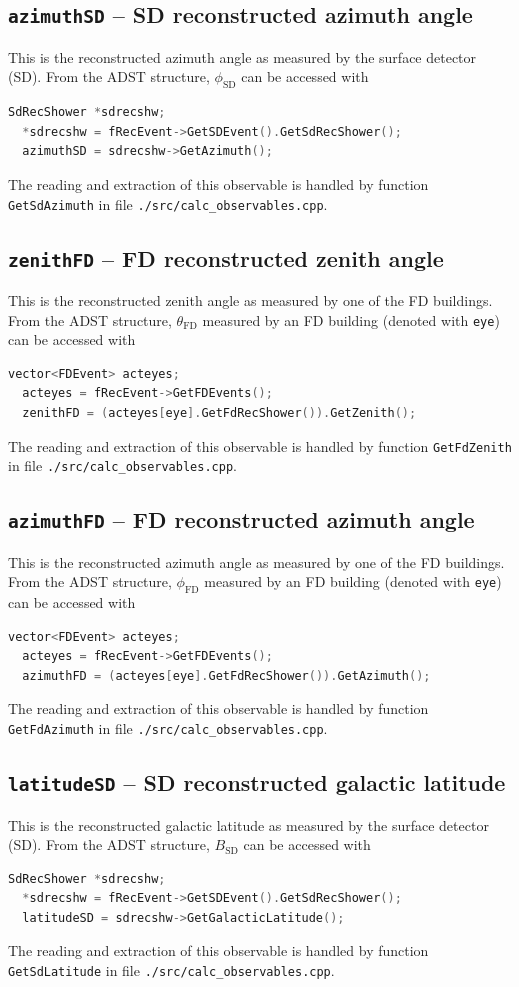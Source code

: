 \documentclass[12pt,a4paper]{report}
\begin{document}
\subsection{\texttt{azimuthSD} -- SD reconstructed azimuth angle}
This is the reconstructed azimuth angle as measured by the surface detector (SD). From the ADST structure, $\phi_{\textrm{SD}}$ can be accessed with
\begin{lstlisting}[language=C++]
  SdRecShower *sdrecshw;
  *sdrecshw = fRecEvent->GetSDEvent().GetSdRecShower();
  azimuthSD = sdrecshw->GetAzimuth();
\end{lstlisting}
The reading and extraction of this observable is handled by function \texttt{GetSdAzimuth} in file \texttt{./src/calc\_observables.cpp}.

\subsection{\texttt{zenithFD} -- FD reconstructed zenith angle}
This is the reconstructed zenith angle as measured by one of the FD buildings. From the ADST structure, $\theta_{\textrm{FD}}$ measured by an FD building (denoted with \texttt{eye}) can be accessed with
\begin{lstlisting}[language=C++]
  vector<FDEvent> acteyes;
  acteyes = fRecEvent->GetFDEvents();
  zenithFD = (acteyes[eye].GetFdRecShower()).GetZenith();
\end{lstlisting}
The reading and extraction of this observable is handled by function \texttt{GetFdZenith} in file \texttt{./src/calc\_observables.cpp}.

\subsection{\texttt{azimuthFD} -- FD reconstructed azimuth angle}
This is the reconstructed azimuth angle as measured by one of the FD buildings. From the ADST structure, $\phi_{\textrm{FD}}$ measured by an FD building (denoted with \texttt{eye}) can be accessed with
\begin{lstlisting}[language=C++]
  vector<FDEvent> acteyes;
  acteyes = fRecEvent->GetFDEvents();
  azimuthFD = (acteyes[eye].GetFdRecShower()).GetAzimuth();
\end{lstlisting}
The reading and extraction of this observable is handled by function \texttt{GetFdAzimuth} in file \texttt{./src/calc\_observables.cpp}.

\subsection{\texttt{latitudeSD} -- SD reconstructed galactic latitude}
This is the reconstructed galactic latitude as measured by the surface detector (SD). From the ADST structure, $B_{\textrm{SD}}$ can be accessed with
\begin{lstlisting}[language=C++]
  SdRecShower *sdrecshw;
  *sdrecshw = fRecEvent->GetSDEvent().GetSdRecShower();
  latitudeSD = sdrecshw->GetGalacticLatitude();
\end{lstlisting}
The reading and extraction of this observable is handled by function \texttt{GetSdLatitude} in file \texttt{./src/calc\_observables.cpp}.
\end{document}
